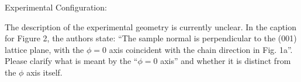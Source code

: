 Experimental Configuration:

The description of the experimental geometry is currently unclear. In the caption for Figure 2, the authors state: ``The sample normal is perpendicular to the (001) lattice plane, with the $\phi = 0$ axis coincident with the chain direction in Fig. 1a''. Please clarify what is meant by the ``$\phi = 0$ axis'' and whether it is distinct from the $\phi$ axis itself.
